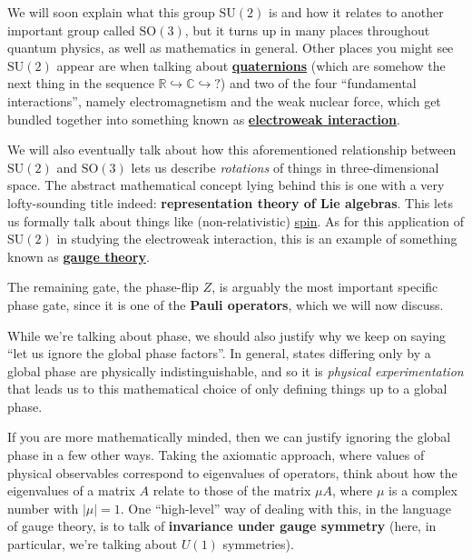\documentclass[fleqn]{article}
\newenvironment{technical}{\noindent}{\medskip}
\begin{document}
\begin{technical}
We will soon explain what this group \(\mathrm{SU}(2)\) is and how it relates to another important group called \(\mathrm{SO}(3)\), but it turns up in many places throughout quantum physics, as well as mathematics in general.
Other places you might see \(\mathrm{SU}(2)\) appear are when talking about \href{https://en.wikipedia.org/wiki/Quaternion}{\textbf{quaternions}} (which are somehow the next thing in the sequence \(\mathbb{R}\hookrightarrow\mathbb{C}\hookrightarrow?\)) and two of the four ``fundamental interactions'', namely electromagnetism and the weak nuclear force, which get bundled together into something known as \href{https://en.wikipedia.org/wiki/Electroweak_interaction}{\textbf{electroweak interaction}}.

We will also eventually talk about how this aforementioned relationship between \(\mathrm{SU}(2)\) and \(\mathrm{SO}(3)\) lets us describe \emph{rotations} of things in three-dimensional space.
The abstract mathematical concept lying behind this is one with a very lofty-sounding title indeed: \textbf{representation theory of Lie algebras}.
This lets us formally talk about things like (non-relativistic) \href{https://en.wikipedia.org/wiki/Spin_(physics)}{spin}.
As for this application of \(\mathrm{SU}(2)\) in studying the electroweak interaction, this is an example of something known as \href{https://en.wikipedia.org/wiki/Gauge_theory}{\textbf{gauge theory}}.

\end{technical}

The remaining gate, the phase-flip \(Z\), is arguably the most important specific phase gate, since it is one of the \textbf{Pauli operators}, which we will now discuss.

While we're talking about phase, we should also justify why we keep on saying ``let us ignore the global phase factors''.
In general, states differing only by a global phase are physically indistinguishable, and so it is \emph{physical experimentation} that leads us to this mathematical choice of only defining things up to a global phase.

\begin{technical}
If you are more mathematically minded, then we can justify ignoring the global phase in a few other ways.
Taking the axiomatic approach, where values of physical observables correspond to eigenvalues of operators, think about how the eigenvalues of a matrix \(A\) relate to those of the matrix \(\mu A\), where \(\mu\) is a complex number with \(|\mu|=1\).
One ``high-level'' way of dealing with this, in the language of gauge theory, is to talk of \textbf{invariance under gauge symmetry} (here, in particular, we're talking about \href{https://en.wikipedia.org/wiki/Circle_group}{\(U(1)\)} symmetries).

\end{technical}
\end{document}
